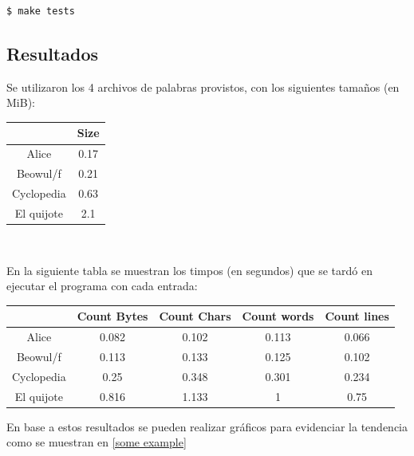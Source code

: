 \begin{lstlisting}
$ make tests
\end{lstlisting}

\subsection{Resultados}

Se utilizaron los 4 archivos de palabras provistos, con los siguientes tama\~nos (en MiB):

\begin{center}

 \begin{tabular}{|c | c|} 
 \hline
  & Size  \\ 
 \hline\hline
Alice & 0.17 \\
\hline
Beowul/f & 0.21 \\
\hline
Cyclopedia & 0.63  \\
\hline
El quijote & 2.1 \\
 \hline
\end{tabular}\\
\end{center}

En la siguiente tabla se muestran los timpos (en segundos) que se tard\'o en ejecutar el programa con cada entrada:

\begin{center}
 \begin{tabular}{|c | c c c c|} 
 \hline
  & Count Bytes & Count Chars & Count words & Count lines \\
 \hline\hline
Alice  & 0.082 & 0.102 & 0.113 & 0.066 \\
\hline
Beowul/f & 0.113 & 0.133 & 0.125 & 0.102 \\
\hline
Cyclopedia  & 0.25 & 0.348 & 0.301 & 0.234 \\
\hline
El quijote & 0.816 & 1.133 & 1 & 0.75 \\
 \hline
\end{tabular}

\end{center}

En base a estos resultados se pueden realizar gr\'aficos para evidenciar la tendencia como se muestran en \ref{some example}

